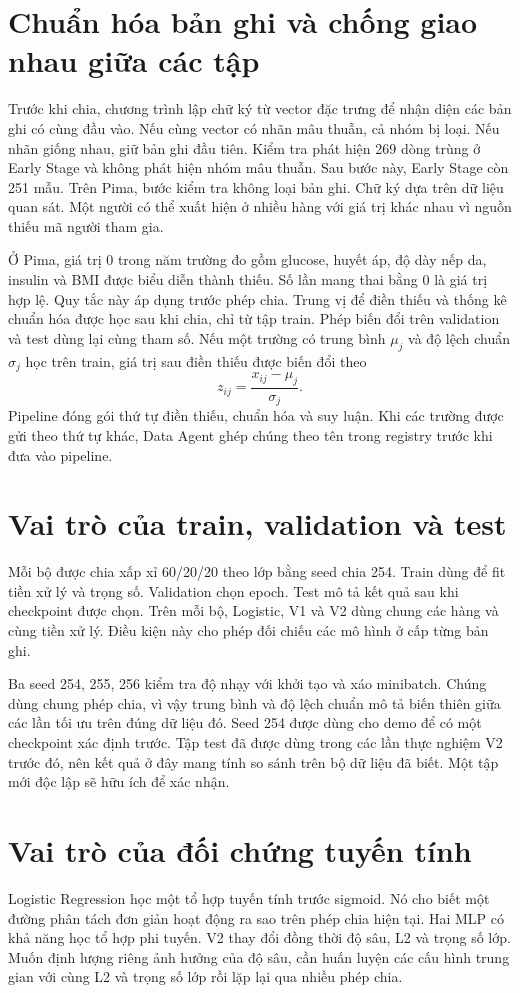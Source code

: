 \section{Chuẩn hóa bản ghi và chống giao nhau giữa các tập}
Trước khi chia, chương trình lập chữ ký từ vector đặc trưng để nhận diện các bản ghi có cùng đầu vào. Nếu cùng vector có nhãn mâu thuẫn, cả nhóm bị loại. Nếu nhãn giống nhau, giữ bản ghi đầu tiên. Kiểm tra phát hiện 269 dòng trùng ở Early Stage và không phát hiện nhóm mâu thuẫn. Sau bước này, Early Stage còn 251 mẫu. Trên Pima, bước kiểm tra không loại bản ghi. Chữ ký dựa trên dữ liệu quan sát. Một người có thể xuất hiện ở nhiều hàng với giá trị khác nhau vì nguồn thiếu mã người tham gia.

Ở Pima, giá trị 0 trong năm trường đo gồm glucose, huyết áp, độ dày nếp da, insulin và BMI được biểu diễn thành thiếu. Số lần mang thai bằng 0 là giá trị hợp lệ. Quy tắc này áp dụng trước phép chia. Trung vị để điền thiếu và thống kê chuẩn hóa được học sau khi chia, chỉ từ tập train. Phép biến đổi trên validation và test dùng lại cùng tham số. Nếu một trường có trung bình \(\mu_j\) và độ lệch chuẩn \(\sigma_j\) học trên train, giá trị sau điền thiếu được biến đổi theo
\[
    z_{ij}=\frac{x_{ij}-\mu_j}{\sigma_j}.
\]
Pipeline đóng gói thứ tự điền thiếu, chuẩn hóa và suy luận. Khi các trường được gửi theo thứ tự khác, Data Agent ghép chúng theo tên trong registry trước khi đưa vào pipeline.



\section{Vai trò của train, validation và test}
Mỗi bộ được chia xấp xỉ 60/20/20 theo lớp bằng seed chia 254. Train dùng để fit tiền xử lý và trọng số. Validation chọn epoch. Test mô tả kết quả sau khi checkpoint được chọn. Trên mỗi bộ, Logistic, V1 và V2 dùng chung các hàng và cùng tiền xử lý. Điều kiện này cho phép đối chiếu các mô hình ở cấp từng bản ghi.

Ba seed 254, 255, 256 kiểm tra độ nhạy với khởi tạo và xáo minibatch. Chúng dùng chung phép chia, vì vậy trung bình và độ lệch chuẩn mô tả biến thiên giữa các lần tối ưu trên đúng dữ liệu đó. Seed 254 được dùng cho demo để có một checkpoint xác định trước. Tập test đã được dùng trong các lần thực nghiệm V2 trước đó, nên kết quả ở đây mang tính so sánh trên bộ dữ liệu đã biết. Một tập mới độc lập sẽ hữu ích để xác nhận.

\section{Vai trò của đối chứng tuyến tính}
Logistic Regression học một tổ hợp tuyến tính trước sigmoid. Nó cho biết một đường phân tách đơn giản hoạt động ra sao trên phép chia hiện tại. Hai MLP có khả năng học tổ hợp phi tuyến. V2 thay đổi đồng thời độ sâu, L2 và trọng số lớp. Muốn định lượng riêng ảnh hưởng của độ sâu, cần huấn luyện các cấu hình trung gian với cùng L2 và trọng số lớp rồi lặp lại qua nhiều phép chia.

